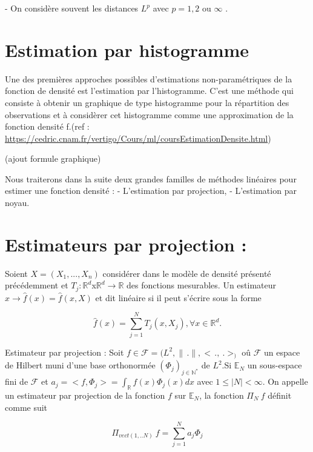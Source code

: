 \documentclass[
]{book}
\theoremstyle{definition}
\theoremstyle{definition}
\theoremstyle{definition}
\theoremstyle{definition}
\theoremstyle{remark}
\begin{document}
\begin{rem}  

- On considère souvent les distances $L^p$ avec $p = 1,2$ ou $\infty$ .
\end{rem}

\hypertarget{estimation-par-histogramme}{%
\section{Estimation par histogramme}\label{estimation-par-histogramme}}

Une des premières approches possibles d'estimations non-paramétriques de la fonction de densité est l'estimation par l'histogramme. C'est une méthode qui consiste à obtenir un graphique de type histogramme pour la répartition des observations et à considèrer cet histogramme comme une approximation de la fonction densité f.(ref : \url{https://cedric.cnam.fr/vertigo/Cours/ml/coursEstimationDensite.html})

(ajout formule graphique)

\hspace*{0.5cm}

Nous traiterons dans la suite deux grandes familles de méthodes linéaires pour estimer une fonction densité : \newline
\hspace*{0.5cm} - L'estimation par projection, \newline
\hspace*{0.5cm} - L'estimation par noyau.

\hypertarget{estimateurs-par-projection}{%
\section{Estimateurs par projection :}\label{estimateurs-par-projection}}

\begin{dfn}
Soient $X= (X_1,...,X_n)$ considérer dans le modèle de densité présenté précédemment et $T_j : \mathbb{R}^d$x$\mathbb{R}^d \rightarrow \mathbb{R}$ des fonctions mesurables.  
Un estimateur $x \rightarrow \hat{f}(x) = \hat{f}(x,X)$ et dit linéaire si il peut s'écrire sous la forme

$$
\hat{f}(x) = \sum^N_{j=1}T_j(x,X_j), \forall x \in \mathbb{R}^d.
$$

\end{dfn}

\begin{dfn}
Estimateur par projection : \newline
Soit $f \in \mathcal F = (L^2 , \parallel\,.\parallel, <\,.,~.>_)$ oû $\mathcal{F} $ un espace de Hilbert muni d'une base orthonormée $(\Phi_j)_{j \in \mathbb{N^*}}$ de $L^2$.Si $\mathbb E _N$  un sous-espace fini de $\mathcal F$ et $a_j = <f,\Phi_j> = \int_{\mathbb R}f(x)\Phi_j(x) dx$ avec $1 \leq |N| < \infty$.\newline
On appelle un estimateur par projection de la fonction $f$ sur $\mathbb E_N$, la fonction $\Pi_N~f$ définit comme suit 

$$
\Pi_{vect(1,..N)}~f = \sum_{j=1}^N a_j \Phi_j
$$
\end{dfn}
\end{document}
